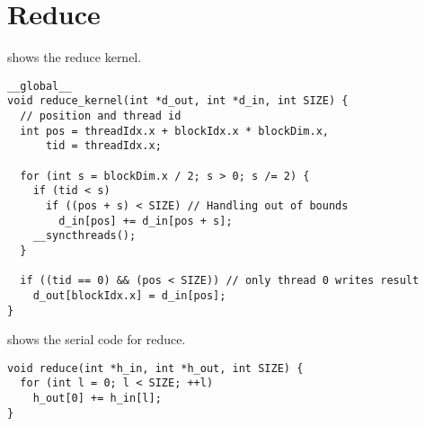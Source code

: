 \section{Reduce}
\label{sec:reduce}

 shows the reduce kernel.

\begin{lstlisting}[caption={Reduce kernel}, label={lst:reduce par}]
__global__
void reduce_kernel(int *d_out, int *d_in, int SIZE) {
  // position and thread id
  int pos = threadIdx.x + blockIdx.x * blockDim.x,
      tid = threadIdx.x;

  for (int s = blockDim.x / 2; s > 0; s /= 2) {
    if (tid < s)
      if ((pos + s) < SIZE) // Handling out of bounds
        d_in[pos] += d_in[pos + s];
    __syncthreads();
  }

  if ((tid == 0) && (pos < SIZE)) // only thread 0 writes result
    d_out[blockIdx.x] = d_in[pos];
}
\end{lstlisting}

%
%
%

 shows the serial code for reduce.

\begin{lstlisting}[caption={Serial reduce}, label={lst:reduce seq}]
void reduce(int *h_in, int *h_out, int SIZE) {
  for (int l = 0; l < SIZE; ++l) 
    h_out[0] += h_in[l];
}
\end{lstlisting}
